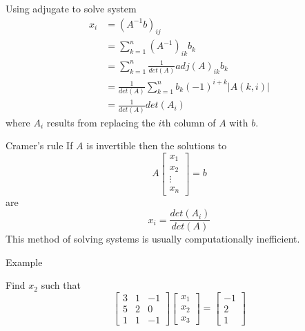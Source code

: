 \documentclass{beamer}
\begin{document}
\begin{frame}{Using adjugate to solve system}
  \begin{align*}
    x_i &= (A^{-1}b)_{ij}\\
        &= \sum_{k=1}^n(A^{-1})_{ik}b_k\\
        &= \sum_{k=1}^n\frac{1}{det(A)}adj(A)_{ik}b_k\\
        &= \frac{1}{det(A)}\sum_{k=1}^nb_k(-1)^{i+k}\left|A(k, i)\right|\\
        &= \frac{1}{det(A)}det(A_i)
  \end{align*}
  where $A_i$ results from replacing the $i$th column of $A$ with $b$.
\end{frame}

\begin{frame}{Cramer's rule}
  If $A$ is invertible then the solutions to
  \begin{equation*}
    A \left[
      \begin{array}{c}
        x_1\\
        x_2\\
        \vdots\\
        x_n
      \end{array}
    \right] = b
  \end{equation*}
  are
  \begin{equation*}
    x_i = \frac{det(A_i)}{det(A)}
  \end{equation*}
  This method of solving systems is usually computationally inefficient.
\end{frame}

\begin{frame}{Example}
  \begin{example}
    Find $x_2$ such that
    \begin{equation*}
      \left[
	\begin{array}{ccc}
          3&1&-1\\
          5&2&0\\
          1&1&-1
	\end{array}
      \right]
      \left[
          \begin{array}{c}
            x_1\\
            x_2\\
            x_3
          \end{array}
        \right]=
        \left[
          \begin{array}{c}
            -1\\
            2\\
            1
          \end{array}
        \right]
    \end{equation*}
  \end{example}
\end{frame}
\end{document}
